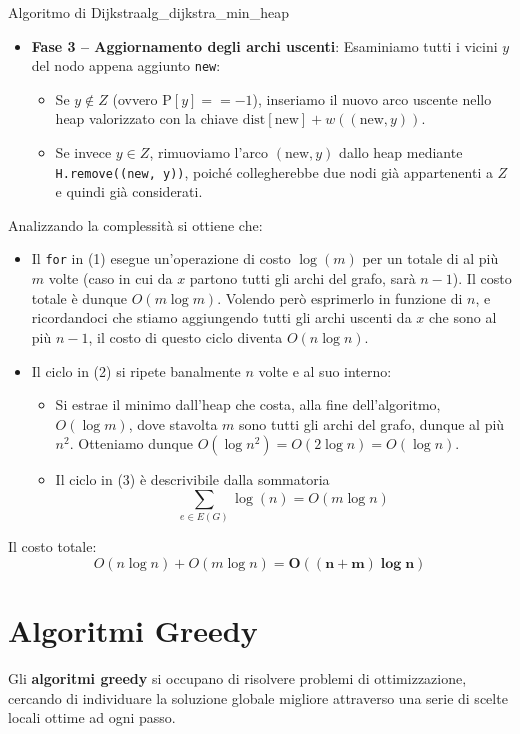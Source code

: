 \documentclass[12pt]{report}
\begin{document}
\begin{algoritmo}{Algoritmo di Dijkstra}{alg_dijkstra_min_heap}
\begin{itemize}
			\item \textbf{Fase 3 -- Aggiornamento degli archi uscenti}:
			Esaminiamo tutti i vicini $y$ del nodo appena aggiunto \texttt{new}:
			\begin{itemize}
				\item Se $y \notin Z$ (ovvero $\text{P}[y] == -1$), inseriamo il nuovo arco uscente nello heap valorizzato con la chiave $\text{dist}[\text{new}] + w((\text{new}, y))$.
				\item Se invece $y \in Z$, rimuoviamo l'arco $(\text{new}, y)$ dallo heap mediante \texttt{H.remove((new, y))}, poiché collegherebbe due nodi già appartenenti a $Z$ e quindi già considerati.
			\end{itemize}
		\end{itemize}
	\end{algoritmo}
	
	Analizzando la complessità si ottiene che:
	\begin{itemize}
		\item Il \texttt{for} in (1) esegue un'operazione di costo $\log(m)$ per un totale di al più $m$ volte (caso in cui da $x$ partono tutti gli archi del grafo, sarà $n - 1$).
		Il costo totale è dunque $O(m \log m)$. Volendo però esprimerlo in funzione di $n$, e ricordandoci che stiamo aggiungendo tutti gli archi uscenti da $x$ che sono al più $n - 1$, il costo di questo ciclo diventa $O(n \log n)$.
		
		\item Il ciclo in (2) si ripete banalmente $n$ volte e al suo interno:
		\begin{itemize}
			\item Si estrae il minimo dall'heap che costa, alla fine dell'algoritmo, $O(\log m)$, dove stavolta $m$ sono tutti gli archi del grafo, dunque al più $n^2$. Otteniamo dunque $O(\log n^2) = O(2 \log n) = O(\log n)$.
			\item Il ciclo in (3) è descrivibile dalla sommatoria
			\[
			\sum_{e \in E(G)} \log(n) = O(m \log n)
			\]
		\end{itemize}
	\end{itemize}
	
	Il costo totale:
	\[
	O(n \log n) + O(m \log n) = \mathbf{O((n + m) \log n)}
	\]
	
	\chapter{Algoritmi Greedy}
	
	Gli \textbf{algoritmi greedy} si occupano di risolvere problemi di ottimizzazione, cercando di individuare la soluzione globale migliore attraverso una serie di scelte locali ottime ad ogni passo.
	
\end{document}
